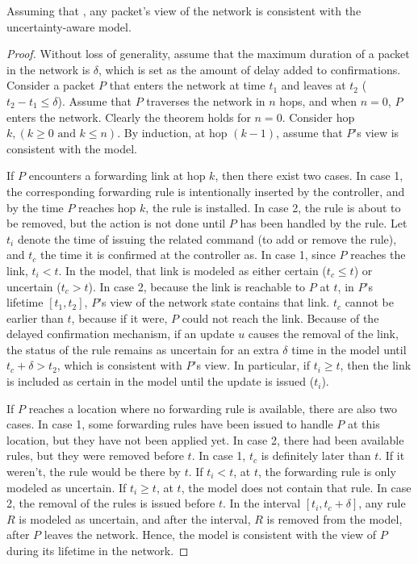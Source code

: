   \vspace{-0.1in}
\begin{theorem} Assuming that ,
any packet's view of the network is consistent with the uncertainty-aware model.
\end{theorem}
  \vspace{-0.1in}
  \vspace{-0.1in}
\begin{proof} Without loss of generality, assume that the maximum duration of a
packet in the network is $\delta$, which is set as the amount of delay added to
confirmations.  Consider a packet $P$ that enters the network at time $t_1$ and
leaves at $t_2$ ($t_2-t_1 \le \delta$).  Assume that $P$ traverses the network in
$n$ hops, and when $n=0$, $P$ enters the network.  Clearly the theorem holds for
$n=0$.  Consider hop $k, (k \ge 0\mbox{ and } k \le n)$.  By induction, at
hop $(k-1)$, assume that $P$'s view is consistent with the model.

If $P$ encounters a forwarding link at hop $k$, then there exist two cases.
In case 1, the corresponding forwarding rule is intentionally inserted by the
controller, and by the time $P$ reaches hop $k$, the rule is installed.  In case
2, the rule is about to be removed, but the action is not done until $P$ has been
handled by the rule.  Let $t_i$ denote the time of issuing the related command (to add or
remove the rule), and $t_c$ the time it is confirmed at the controller as.  
In case 1, since $P$ reaches the link, $t_i < t$.  In the model, that
link is modeled as either certain ($t_c \le t$) or uncertain ($t_c > t$).  In
case 2, because the link is reachable to $P$ at $t$, in $P$'s lifetime $[t_1,
t_2]$, $P$'s view of the network state contains that link.  $t_c$ cannot be
earlier than $t$, because if it were, $P$ could not reach the link.  Because of the delayed
confirmation mechanism, if an update $u$ causes the removal of the link, the
status of the rule remains as uncertain for an extra $\delta$ time in the model
until $t_c + \delta > t_2$, which is consistent with $P$'s view.  
In particular, if $t_i \ge t$, then the link is included as certain in the model
until the update is issued ($t_i$).

If $P$ reaches a location where no forwarding rule is available, there are also
two cases.  In case 1, some forwarding rules have been issued to handle $P$ at this
location, but they have not been applied yet. In case 2, there had been available rules, but
they were removed before $t$.  In case 1, $t_c$ is definitely later than $t$.
If it weren't, the rule would be there by $t$.  If $t_i < t$, at $t$, the forwarding rule
is only modeled as uncertain.  If $t_i \ge t$, at $t$, the model does not
contain that rule.  In case 2, the removal of the rules is issued before $t$.
In the interval $[t_i, t_c + \delta]$, any rule $R$ is modeled as uncertain,
and after the interval, $R$ is removed from the model, after $P$ leaves the
network.  Hence, the model is consistent with the view of $P$ during its
lifetime in the network.
\end{proof}

